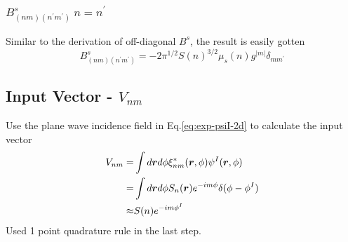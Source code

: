 \documentclass [10pt,letterpaper]{article}
\renewcommand{\vec}{\vectorsym}
\begin{document}
\subsubsection{$B^s_{(n m)(n^\prime m^\prime)} \ n=n^\prime$}
\label{subsub:Bsnmnpmp-diagonal}
Similar to the derivation of off-diagonal $B^s$, the result is easily gotten
\begin{equation} \label{eq:retsult-Bsnmnpmp-diagonal-1p}
	B^s_{(n m)(n^\prime m^\prime)}
	=
	-2 
	\pi^{1/2}
	S(n)^{3/2}
	\mu_s(n)g^{\lvert m\rvert} 
	\delta_{m m^\prime}
\end{equation}

\subsection{Input Vector - $V_{n m}$}
\label{input-vector-Vnm}
Use the plane wave incidence field in Eq.\eqref{eq:exp-psiI-2d} to calculate the input vector
\begin{equation} \label{eq:result-Vnm-1pt}
	\begin{split}
		V_{n m}
		=&
		\int d\vec{r} d\phi
		\xi^*_{n m} (\vec{r},\phi)
		\psi^I (\vec{r},\phi)
		\\
		=&
		\int d\vec{r} d\phi
		S_n(\vec{r})
		e^{-i m \phi}
		\delta(\phi-\phi^I)
		\\
		\approx&
		S(n)e^{-i m \phi^I}
	\end{split}
\end{equation}
Used 1 point quadrature rule in the last step.
\end{document}
